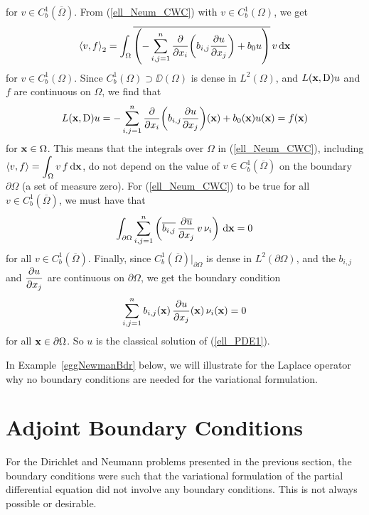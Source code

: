 for $\displaystyle v \in C^{1}_b(\overline{\Omega})$.
From (\ref{ell_Neum_CWC}) with $\displaystyle v \in C^1_b(\Omega)$, we get
\[
\ps{v}{f}_2 = \int_\Omega \overline{\left(-
\sum_{i,j=1}^n \pdfdx{\left( b_{i,j} \pdydx{u}{x_j} \right)}{x_i}
+ b_0 u \right)} \, v \dx{\VEC{x}}
\]
for $\displaystyle v \in C^{1}_b(\Omega)$.
Since $\displaystyle C^{1}_b(\Omega) \supset \DD(\Omega)$ is dense in
$\displaystyle L^2(\Omega)$, and $L(\VEC{x},\diff)u$ and $f$ are
continuous on $\Omega$, we find that
\begin{equation} \label{ell_Neum_CWCB}
L(\VEC{x}, \diff)u = - \sum_{i,j=1}^n
\pdfdx{\left( b_{i,j} \pdydx{u}{x_j} \right)}{x_i}(\VEC{x})
+ b_0(\VEC{x}) u(\VEC{x}) = f(\VEC{x})
\end{equation}
for $\VEC{x} \in \Omega$.  This means that
the integrals over $\Omega$ in (\ref{ell_Neum_CWC}), including
$\displaystyle \ps{v}{f} = \int_\Omega v\,f \dx{\VEC{x}}$, do not
depend on the value of $\displaystyle v \in C^1_b(\overline{\Omega})$ on the
boundary $\partial \Omega$ (a set of measure zero).  For
(\ref{ell_Neum_CWC}) to be true for all $v \in C^1_b(\overline{\Omega})$,
we must have that
\[
\int_{\partial \Omega}
\sum_{i,j=1}^n \left( \overline{b_{i,j}}\,\pdydx{\overline{u}}{x_j}
\,v \, \nu_i \right) \dx{\VEC{x}} = 0
\]
for all $\displaystyle v \in C^{1}_b(\overline{\Omega})$.
Finally, since $\displaystyle C_b^1(\overline{\Omega})\big|_{\partial \Omega}$
is dense in $\displaystyle L^2(\partial \Omega)$, and the $b_{i,j}$ and
$\displaystyle \pdydx{u}{x_j}$ are continuous on $\partial \Omega$, we
get the boundary condition
\begin{equation} \label{ell_rm_bdr_Neum}
\sum_{i,j=1}^n b_{i,j}(\VEC{x})\,\pdydx{u}{x_j}(\VEC{x})\,
\nu_i(\VEC{x}) = 0
\end{equation}
for all $\VEC{x} \in \partial \Omega$.
So $u$ is the classical solution of (\ref{ell_PDE1}).

In Example~\ref{eggNewmanBdr} below, we will illustrate for the
Laplace operator why no boundary conditions are needed for the
variational formulation.

\section{Adjoint Boundary Conditions}

For the Dirichlet and Neumann problems presented in the previous
section, the boundary conditions were such that the variational
formulation of the partial differential equation did not involve any
boundary conditions.  This is not always possible or desirable.

